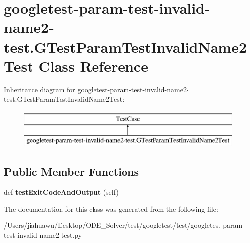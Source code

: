 \hypertarget{classgoogletest-param-test-invalid-name2-test_1_1_g_test_param_test_invalid_name2_test}{}\section{googletest-\/param-\/test-\/invalid-\/name2-\/test.G\+Test\+Param\+Test\+Invalid\+Name2\+Test Class Reference}
\label{classgoogletest-param-test-invalid-name2-test_1_1_g_test_param_test_invalid_name2_test}
Inheritance diagram for googletest-\/param-\/test-\/invalid-\/name2-\/test.G\+Test\+Param\+Test\+Invalid\+Name2\+Test\+:\begin{figure}[H]
\begin{center}
\leavevmode
\includegraphics[height=2.000000cm]{classgoogletest-param-test-invalid-name2-test_1_1_g_test_param_test_invalid_name2_test}
\end{center}
\end{figure}
\subsection*{Public Member Functions}
\begin{DoxyCompactItemize}
\item 
\mbox{\label{classgoogletest-param-test-invalid-name2-test_1_1_g_test_param_test_invalid_name2_test_a3fbc22a46315dc7ba10f0203349de7c7}} 
def {\bfseries test\+Exit\+Code\+And\+Output} (self)
\end{DoxyCompactItemize}


The documentation for this class was generated from the following file\+:\begin{DoxyCompactItemize}
\item 
/\+Users/jiahuawu/\+Desktop/\+O\+D\+E\+\_\+\+Solver/test/googletest/test/googletest-\/param-\/test-\/invalid-\/name2-\/test.\+py\end{DoxyCompactItemize}
